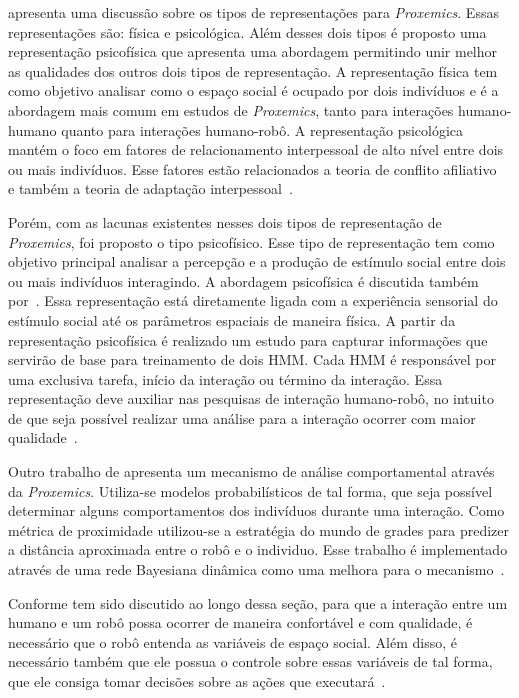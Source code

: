  apresenta uma discussão sobre os tipos de representações para \emph{Proxemics}. Essas representações são: física e psicológica. Além desses dois tipos é proposto uma representação psicofísica que apresenta uma abordagem permitindo unir melhor as qualidades dos outros dois tipos de representação. A representação física tem como objetivo analisar como o espaço social é ocupado por dois indivíduos e é a abordagem mais comum em estudos de \emph{Proxemics}, tanto para interações humano-humano quanto para interações humano-robô. A representação psicológica mantém o foco em fatores de relacionamento interpessoal de alto nível entre dois ou mais indivíduos. Esse fatores estão relacionados a teoria de conflito afiliativo~\cite{Argyle:1965} e também a teoria de adaptação interpessoal~\cite{Burgoon:2007}.

Porém, com as lacunas existentes nesses dois tipos de representação de \emph{Proxemics}, foi proposto o tipo psicofísico. Esse tipo de representação tem como objetivo principal analisar a percepção e a produção de estímulo social entre dois ou mais indivíduos interagindo. A abordagem psicofísica é discutida também por~. Essa representação está diretamente ligada com a experiência sensorial do estímulo social até os parâmetros espaciais de maneira física. A partir da representação psicofísica é realizado um estudo para capturar informações que servirão de base para treinamento de dois HMM. Cada HMM é responsável por uma exclusiva tarefa, início da interação ou término da interação. Essa representação deve auxiliar nas pesquisas de interação humano-robô, no intuito de que seja possível realizar uma análise para a interação ocorrer com maior qualidade~\cite{Mead:2012}.

Outro trabalho de  apresenta um mecanismo de análise comportamental através da \emph{Proxemics}. Utiliza-se modelos probabilísticos de tal forma, que seja possível determinar alguns comportamentos dos indivíduos durante uma interação. Como métrica de proximidade utilizou-se a estratégia do mundo de grades para predizer a distância aproximada entre o robô e o individuo. Esse trabalho é implementado através de uma rede Bayesiana dinâmica como uma melhora para o mecanismo~\cite{Mead:2012b}.

Conforme tem sido discutido ao longo dessa seção, para que a interação entre um humano e um robô possa ocorrer de maneira confortável e com qualidade, é necessário que o robô entenda as variáveis de espaço social. Além disso, é necessário também que ele possua o controle sobre essas variáveis de tal forma, que ele consiga tomar decisões sobre as ações que executará~\cite{Mead:2013b}.

